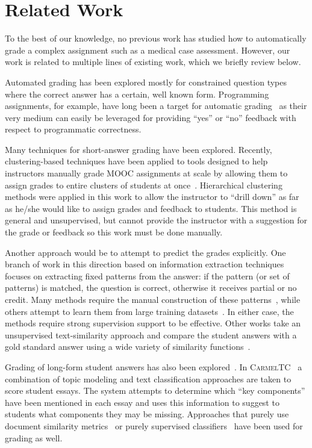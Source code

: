 \section{Related Work}

To the best of our knowledge, no previous work has studied how to automatically grade
a complex assignment such as a medical case assessment. However, our work
is related to multiple lines of existing work, which we briefly review below. 

Automated grading has been explored mostly for constrained question
types where the correct answer has a certain, well known form. Programming
assignments, for example, have long been a target for automatic
grading~\cite{Forsythe:1965:CACM, Hext:1969:CACM, Helmick:2007:ITICSE,
Martin:1973:SIGCSE} as their very medium can easily be leveraged for
providing ``yes'' or ``no'' feedback with respect to programmatic
correctness.

Many techniques for short-answer grading have been explored. Recently,
clustering-based techniques have been applied to tools designed to help
instructors manually grade MOOC assignments at scale by allowing them to
assign grades to entire clusters of students at
once~\cite{Brooks:2014:Powergrading}. Hierarchical clustering methods were
applied in this work to allow the instructor to ``drill down'' as far as
he/she would like to assign grades and feedback to students. This method
is general and unsupervised, but cannot provide the instructor with a
suggestion for the grade or feedback so this work must be done manually.

Another approach would be to attempt to predict the grades explicitly. One
branch of work in this direction based on information extraction techniques
focuses on extracting fixed patterns from the answer: if the pattern (or
set of patterns) is matched, the question is correct, otherwise it receives
partial or no credit. Many methods require the manual construction of these
patterns~\cite{Mitchell:2002:ICAA, Leacock:2003:CatH}, while others attempt to
learn them from large training datasets~\cite{Pulman:2005:EdAppsNLP}. In either
case, the methods require strong supervision support to be effective.  Other
works take an unsupervised text-similarity approach and compare the student
answers with a gold standard answer using a wide variety of similarity
functions~\cite{Mohler:2009:ACL}.

Grading of long-form student answers has also been
explored~\cite{Balfour:2013, Chen:2014:IRRODL}. In
\textsc{CarmelTC}~\cite{Rose:2003:HLT-NAACL-EDUC} a combination of topic
modeling and text classification approaches are taken to score student
essays. The system attempts to determine which ``key components'' have been
mentioned in each essay and uses this information to suggest to students
what components they may be missing. Approaches that purely use document
similarity metrics~\cite{Duwairi:2006:CHB} or purely supervised
classifiers~\cite{Larkey:1998:SIGIR} have been used for grading as well.


